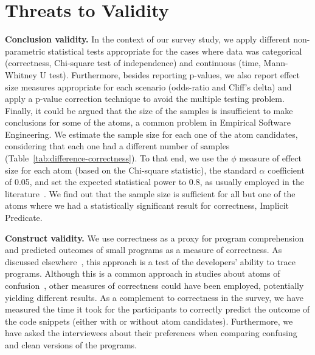 \section{Threats to Validity}
\label{threat}


\textbf{Conclusion validity.} 
In the context of our survey study, we apply different non-parametric statistical tests appropriate for the cases where data was categorical (correctness, Chi-square test of independence) and continuous (time, Mann-Whitney U test). Furthermore, besides reporting p-values, we also report effect size measures appropriate for each scenario (odds-ratio and Cliff's delta) and apply a p-value correction technique to avoid the multiple testing problem. Finally, it could be argued that the size of the samples is insufficient to make conclusions for some of the atoms, a common problem in Empirical Software Engineering. We estimate the sample size for each one of the atom candidates, considering that each one had a different number of samples (Table~\ref{tab:difference-correctness}). To that end, we use the $\phi$ measure of effect size for each atom (based on the Chi-square statistic), the standard $\alpha$ coefficient of 0.05, and set the expected statistical power to 0.8, as usually employed in the literature~\cite{Ellis:2010:EGE}. We find out that the sample size is sufficient for all but one of the atoms where we had a statistically significant result for correctness, Implicit Predicate. 


\textbf{Construct validity.} We use correctness as a proxy for program comprehension and predicted outcomes of small programs as a measure of correctness. As discussed elsewhere~\cite{Oliveira:2020:ECR}, this approach is a test of the developers' ability to trace programs. Although this is a common approach in studies about atoms of confusion~\cite{TheEyesDoNotLie,Langhout:2021:ACJ,DBLP:conf/sigsoft/GopsteinIYDZYC17}, other measures of correctness could have been employed, potentially yielding different results. As a complement to correctness in the survey, we have measured the time it took for the participants to correctly predict the outcome of the code snippets (either with or without atom candidates). Furthermore, we have  asked the interviewees about their preferences when comparing confusing and clean versions of the programs.


